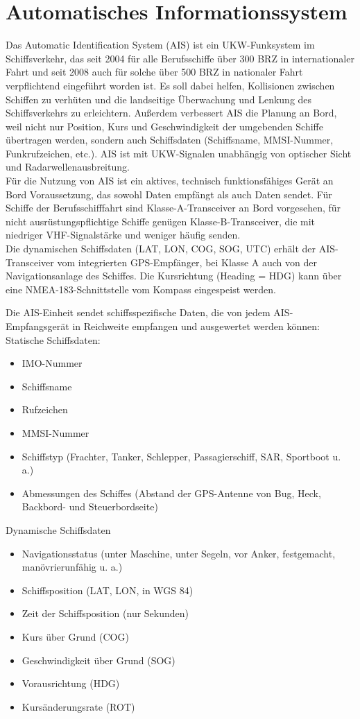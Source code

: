 \section{Automatisches Informationssystem}\label{s.Automatisches Informationssystem (AIS)}
Das Automatic Identification System (AIS) ist ein UKW-Funksystem im Schiffsverkehr, das seit 2004 für alle Berufsschiffe über 300 BRZ in internationaler Fahrt und seit 2008 auch für solche über 500 BRZ in nationaler Fahrt verpflichtend eingeführt worden ist. Es soll dabei helfen, Kollisionen zwischen Schiffen zu verhüten und die landseitige Überwachung und Lenkung des Schiffsverkehrs zu erleichtern. Außerdem verbessert AIS die Planung an Bord, weil nicht nur Position, Kurs und Geschwindigkeit der umgebenden Schiffe übertragen werden, sondern auch Schiffsdaten (Schiffsname, MMSI-Nummer, Funkrufzeichen, etc.). AIS ist mit UKW-Signalen unabhängig von optischer Sicht und Radarwellenausbreitung.\\
Für die Nutzung von AIS ist ein aktives, technisch funktionsfähiges Gerät an Bord Voraussetzung, das sowohl Daten empfängt als auch Daten sendet. Für Schiffe der Berufsschifffahrt sind Klasse-A-Transceiver an Bord vorgesehen, für nicht ausrüstungspflichtige Schiffe genügen Klasse-B-Transceiver, die mit niedriger VHF-Signalstärke und weniger häufig senden.  \\
Die dynamischen Schiffsdaten (LAT, LON, COG, SOG, UTC) erhält der AIS-Transceiver vom integrierten GPS-Empfänger, bei Klasse A auch von der Navigationsanlage des Schiffes. Die Kursrichtung (Heading =  HDG) kann über eine NMEA-183-Schnittstelle vom Kompass eingespeist werden.

Die AIS-Einheit sendet schiffsspezifische Daten, die von jedem AIS-Empfangsgerät in Reichweite empfangen und ausgewertet werden können:
Statische Schiffsdaten: 
\begin{itemize}
\item IMO-Nummer
\item Schiffsname
\item Rufzeichen
\item MMSI-Nummer
\item Schiffstyp (Frachter, Tanker, Schlepper, Passagierschiff, SAR, Sportboot u. a.)
\item Abmessungen des Schiffes (Abstand der GPS-Antenne von Bug, Heck, Backbord- und Steuerbordseite)
\end{itemize}

Dynamische Schiffsdaten
\begin{itemize}
\item Navigationsstatus (unter Maschine, unter Segeln, vor Anker, festgemacht, manövrierunfähig u. a.)
\item Schiffsposition (LAT, LON, in WGS 84)
\item Zeit der Schiffsposition (nur Sekunden)
\item Kurs über Grund (COG)
\item Geschwindigkeit über Grund (SOG)
\item Vorausrichtung (HDG)
\item Kursänderungsrate (ROT)
\end{itemize}

